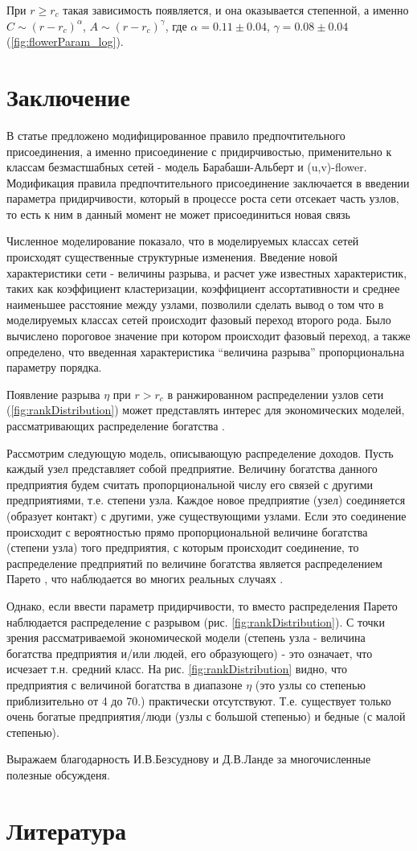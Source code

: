 \documentclass[10pt,aps,pra]{revtex4-1}
\begin{document}
        При $r \geq r_c$ такая зависимость появляется, и она оказывается степенной, а именно $C \sim {(r-r_c)}^\alpha$, $A \sim {(r-r_c)}^\gamma$, где $\alpha = 0.11 \pm 0.04$, $\gamma = 0.08 \pm 0.04$ (\ref{fig:flowerParam_log}).

\section{Заключение}

    В статье предложено модифицированное правило предпочтительного присоединения, а именно присоединение с придирчивостью, применительно к классам безмастшабных сетей - модель Барабаши-Альберт и (u,v)-flower. Модификация правила предпочтительного присоединение заключается в введении параметра придирчивости, который в процессе роста сети отсекает часть узлов,  то есть к ним в данный момент не может присоединиться новая связь

    Численное моделирование показало, что в моделируемых классах сетей происходят существенные структурные изменения. Введение новой характеристики сети - величины разрыва, и расчет уже известных характеристик, таких как коэффициент кластеризации, коэффициент ассортативности и среднее наименьшее расстояние между узлами, позволили сделать вывод о том что в моделируемых классах сетей происходит фазовый переход второго рода. Было вычислено пороговое значение при котором происходит фазовый переход, а также определено, что введенная характеристика ``величина разрыва'' пропорциональна параметру порядка.

    Появление разрыва $\eta$ при $r>r_c$ в ранжированном распределении узлов сети (\ref{fig:rankDistribution}) может представлять интерес для экономических моделей, рассматривающих распределение богатства \cite{Economics2}.

    Рассмотрим следующую модель, описывающую распределение доходов. Пусть каждый узел представляет собой предприятие. Величину богатства данного предприятия будем считать пропорциональной числу его связей с другими предприятиями, т.е. степени узла. Каждое новое предприятие (узел) соединяется (образует контакт) с другими, уже существующими узлами. Если это соединение происходит с вероятностью прямо пропорциональной величине богатства (степени узла) того предприятия, с которым происходит соединение, то распределение предприятий по величине богатства является распределением Парето \cite{Economics2, Economics1}, что наблюдается во многих реальных случаях \cite{Economics1}.

    Однако, если ввести параметр придирчивости, то вместо распределения Парето наблюдается распределение с разрывом (рис. \ref{fig:rankDistribution}). С точки зрения рассматриваемой экономической модели (степень узла - величина богатства предприятия и/или людей, его образующего) - это означает, что исчезает т.н. средний класс. На рис. \ref{fig:rankDistribution} видно, что предприятия с величиной богатства в диапазоне $\eta$ (это узлы со степенью приблизительно от 4 до 70.) практически отсутствуют. Т.е. существует только очень богатые предприятия/люди (узлы  с большой степенью) и бедные (с малой степенью). 
    
    Выражаем благодарность И.В.Безсуднову и Д.В.Ланде за многочисленные полезные обсужденя.

\section{Литература}

 

\end{document}

